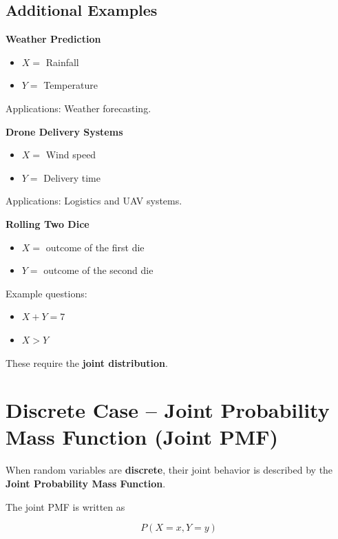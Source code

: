 \documentclass[12pt]{article}
\begin{document}
\subsection{Additional Examples}

\textbf{Weather Prediction}

\begin{itemize}
\item $X =$ Rainfall
\item $Y =$ Temperature
\end{itemize}

Applications: Weather forecasting.

\vspace{0.3cm}

\textbf{Drone Delivery Systems}

\begin{itemize}
\item $X =$ Wind speed
\item $Y =$ Delivery time
\end{itemize}

Applications: Logistics and UAV systems.

\vspace{0.3cm}

\textbf{Rolling Two Dice}

\begin{itemize}
\item $X =$ outcome of the first die
\item $Y =$ outcome of the second die
\end{itemize}

Example questions:

\begin{itemize}
\item $X + Y = 7$
\item $X > Y$
\end{itemize}

These require the \textbf{joint distribution}.

\section{Discrete Case -- Joint Probability Mass Function (Joint PMF)}

When random variables are \textbf{discrete}, their joint behavior is described by the \textbf{Joint Probability Mass Function}.

The joint PMF is written as

\[
P(X = x, Y = y)
\]
\end{document}
